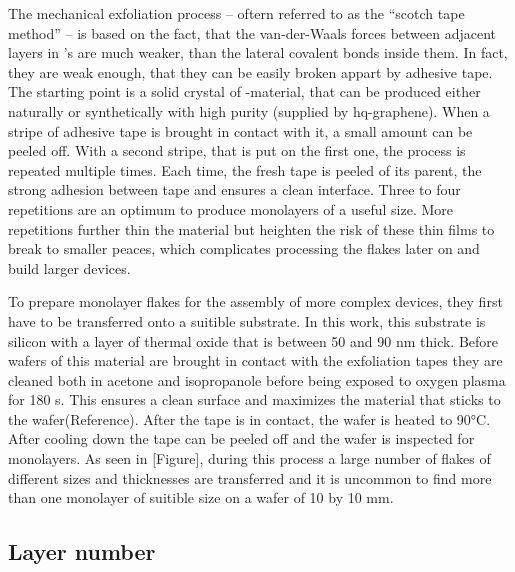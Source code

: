 The mechanical exfoliation process -- oftern referred to as the ``scotch tape method'' -- is based on the fact, that the van-der-Waals forces between adjacent layers in \tmd's are much weaker, than the lateral covalent bonds inside them. In fact, they are weak enough, that they can be easily broken appart by adhesive tape. The starting point is a solid crystal of \tmd-material, that can be produced either naturally or synthetically with high purity (supplied by hq-graphene). When a stripe of adhesive tape is brought in contact with it, a small amount can be peeled off. With a second stripe, that is put on the first one, the process is repeated multiple times. Each time, the fresh tape is peeled of its parent, the strong adhesion between tape and \tmdg ensures a clean interface. Three to four repetitions are an optimum to produce monolayers of a useful size. More repetitions further thin the material but heighten the risk of these thin films to break to smaller peaces, which complicates processing the flakes later on and build larger devices. 

To prepare monolayer flakes for the assembly of more complex devices, they first have to be transferred onto a suitible substrate. In this work, this substrate is silicon with a layer of thermal oxide that is between 50 and 90 nm thick. Before wafers of this material are brought in contact with the exfoliation tapes they are cleaned both in acetone and isopropanole before being exposed to oxygen plasma for 180 s. This ensures a clean surface and maximizes the material that sticks to the wafer(Reference). After the tape is in contact, the wafer is heated to 90°C. After cooling down the tape can be peeled off and the wafer is inspected for monolayers. As seen in [Figure], during this process a large number of flakes of different sizes and thicknesses are transferred and it is uncommon to find more than one monolayer of suitible size on a wafer of 10 by 10 mm. 

\subsection{Layer number}

